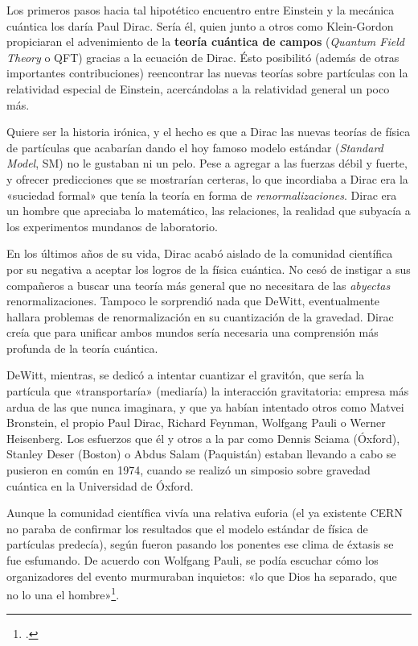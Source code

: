 \documentclass[11pt,a4paper,titlepage]{article}
\begin{document}
Los primeros pasos hacia tal hipotético encuentro entre Einstein y la mecánica cuántica los daría Paul Dirac. Sería él, quien junto a otros como Klein-Gordon propiciaran el advenimiento de la \textbf{teoría cuántica de campos} (\textit{Quantum Field Theory} o QFT) gracias a la ecuación de Dirac. Ésto posibilitó (además de otras importantes contribuciones) reencontrar las nuevas teorías sobre partículas con la relatividad especial de Einstein, acercándolas a la relatividad general un poco más.

Quiere ser la historia irónica, y el hecho es que a Dirac las nuevas teorías de física de partículas que acabarían dando el hoy famoso modelo estándar (\textit{Standard Model}, SM) no le gustaban ni un pelo. Pese a agregar a las fuerzas débil y fuerte, y ofrecer predicciones que se mostrarían certeras, lo que incordiaba a Dirac era la «suciedad formal» que tenía la teoría en forma de \textit{renormalizaciones}. Dirac era un hombre que apreciaba lo matemático, las relaciones, la realidad que subyacía a los experimentos mundanos de laboratorio.

En los últimos años de su vida, Dirac acabó aislado de la comunidad científica por su negativa a aceptar los logros de la física cuántica. No cesó de instigar a sus compañeros a buscar una teoría más general que no necesitara de las \textit{abyectas} renormalizaciones. Tampoco le sorprendió nada que DeWitt, eventualmente hallara problemas de renormalización en su cuantización de la gravedad. Dirac creía que para unificar ambos mundos sería necesaria una comprensión más profunda de la teoría cuántica.

DeWitt, mientras, se dedicó a intentar cuantizar el gravitón, que sería la partícula que «transportaría» (mediaría) la interacción gravitatoria: empresa más ardua de las que nunca imaginara, y que ya habían intentado otros como Matvei Bronstein, el propio Paul Dirac, Richard Feynman, Wolfgang Pauli o Werner Heisenberg. Los esfuerzos que él y otros a la par como Dennis Sciama (Óxford), Stanley Deser (Boston) o Abdus Salam (Paquistán) estaban llevando a cabo se pusieron en común en 1974, cuando se realizó un simposio sobre gravedad cuántica en la Universidad de Óxford.

Aunque la comunidad científica vivía una relativa euforia (el ya existente CERN no paraba de confirmar los resultados que el modelo estándar de física de partículas predecía), según fueron pasando los ponentes ese clima de éxtasis se fue esfumando. De acuerdo con Wolfgang Pauli, se podía escuchar cómo los organizadores del evento murmuraban inquietos: «lo que Dios ha separado, que no lo una el hombre»\footnote{\cite[p.~242]{teoriaperfecta}.}.
\end{document}

